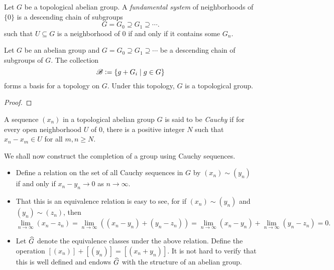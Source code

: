 \begin{definition}
    Let $G$ be a topological abelian group. A \emph{fundamental system} of neighborhoods of $\{0\}$ is a descending chain of subgroups 
    \begin{equation*}
        G = G_0\supseteq G_1\supseteq\cdots.
    \end{equation*}
    such that $U\subseteq G$ is a neighborhood of $0$ if and only if it contains some $G_n$.
\end{definition}

\begin{proposition}
    Let $G$ be an abelian group and $G=G_0\supseteq G_1\supseteq\cdots$ be a descending chain of subgroups of $G$. The collection 
    \begin{equation*}
        \mathscr B := \{g + G_i\mid g\in G\}
    \end{equation*}
    forms a basis for a topology on $G$. Under this topology, $G$ is a topological group.
\end{proposition}
\begin{proof}
    
\end{proof}

\begin{definition}
    A sequence $(x_n)$ in a topological abelian group $G$ is said to be \emph{Cauchy} if for every open neighborhood $U$ of $0$, there is a positive integer $N$ such that $x_n - x_m\in U$ for all $m,n\ge N$.
\end{definition}

We shall now construct the completion of a group using Cauchy sequences.
\begin{itemize}
    \item Define a relation on the set of all Cauchy sequences in $G$ by $(x_n)\sim (y_n)$ if and only if $x_n - y_n\to 0$ as $n\to\infty$.
    \item That this is an equivalence relation is easy to see, for if $(x_n)\sim(y_n)$ and $(y_n)\sim(z_n)$, then 
    \begin{equation*}
        \lim_{n\to\infty}(x_n - z_n) = \lim_{n\to\infty}\left((x_n - y_n) + (y_n - z_n)\right) = \lim_{n\to\infty}(x_n - y_n) + \lim_{n\to\infty}(y_n - z_n) = 0.
    \end{equation*}
    \item Let $\widehat{G}$ denote the equivalence classes under the above relation. Define the operation $[(x_n)] + [(y_n)] = [(x_n + y_n)]$. It is not hard to verify that this is well defined and endows $\widehat{G}$ with the structure of an abelian group.
\end{itemize}

